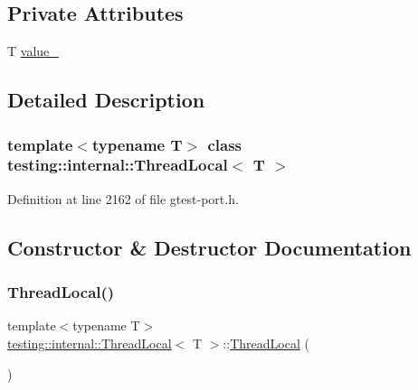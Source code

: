 \subsection*{Private Attributes}
\begin{DoxyCompactItemize}
\item 
T \hyperlink{classtesting_1_1internal_1_1ThreadLocal_ae0db6b57bdb752feb343ee4d935708e2}{value\+\_\+}
\end{DoxyCompactItemize}


\subsection{Detailed Description}
\subsubsection*{template$<$typename T$>$\newline
class testing\+::internal\+::\+Thread\+Local$<$ T $>$}



Definition at line 2162 of file gtest-\/port.\+h.



\subsection{Constructor \& Destructor Documentation}
\mbox{\label{classtesting_1_1internal_1_1ThreadLocal_a106f3a3ad15d08f95f9887105d2a1af5}} 
\subsubsection{\texorpdfstring{Thread\+Local()}{ThreadLocal()}\hspace{0.1cm}{\footnotesize\ttfamily [1/2]}}
{\footnotesize\ttfamily template$<$typename T$>$ \\
\hyperlink{classtesting_1_1internal_1_1ThreadLocal}{testing\+::internal\+::\+Thread\+Local}$<$ T $>$\+::\hyperlink{classtesting_1_1internal_1_1ThreadLocal}{Thread\+Local} (\begin{DoxyParamCaption}{ }\end{DoxyParamCaption})\hspace{0.3cm}{\ttfamily [inline]}}



